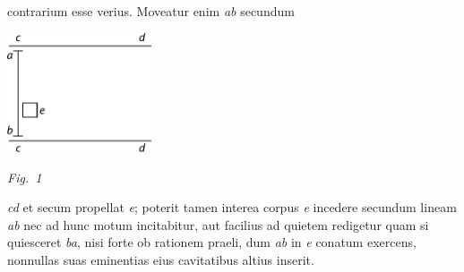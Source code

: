 %
contrarium\hspace{0.1mm} esse\hspace{0.1mm} verius. \hspace{0.1mm}
Moveatur\hspace{0.1mm} enim \hspace{0.1mm}\textit{ab} \hspace{0.1mm}secundum
\pend
  \vspace{1.2em}%
  \centerline{\includegraphics[width=0.32\textwidth]{gesamttex/edit_VIII,3/images/LH_37_04_078_d.pdf}}%
  \vspace{0.5em}%
  \centerline{\lbrack\textit{Fig.~1}\rbrack}%
  \label{LH_37_04_078v_Fig.1}%
  \newpage
\pstart
\noindent \textit{cd}
et secum propellat \textit{e}; 
poterit tamen interea corpus \textit{e}\protect{}
incedere secundum lineam \textit{ab}
nec
%
%
ad hunc motum incitabitur,
aut facilius ad quietem\protect{} redigetur
quam si quiesceret
\textit{ba},
nisi forte ob rationem praeli,\protect{}
dum \textit{ab} in \textit{e} conatum exercens,\protect{}
nonnullas suas eminentias\protect{}
eius cavitatibus\protect{} altius inserit.
\pend
%
%
  \count{}
\count{}
\count{}
%
%
%
%
